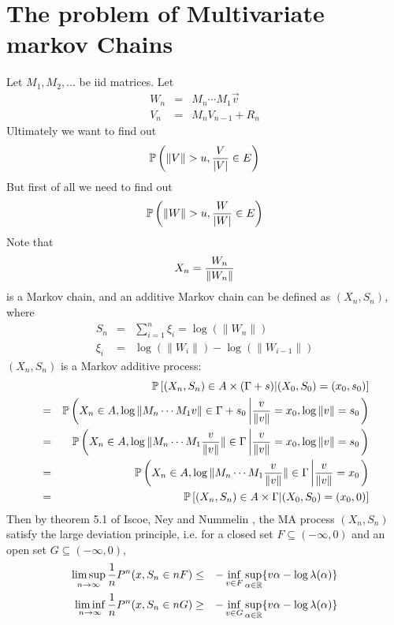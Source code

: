 \documentclass[12pt]{article}
\begin{document}
\section{The problem of Multivariate markov Chains}
Let $M_1, M_2, \dots$ be iid matrices. Let
\begin{eqnarray*}
  W_n &=& M_n \cdots M_1 \vec v  \\
  V_n &=& M_n V_{n-1} + R_n
\end{eqnarray*}
Ultimately we want to find out
\[
\P\left(
  \| V \| > u, {V \over |V|}  \in E
\right)
\]
But first of all we need to find out
\[
\P\left(
  \| W \| > u, {W \over |W|} \in E
\right)
\]
Note that
\[
X_n = {W_n \over \|W_n\|}
\]
is a Markov chain, and an additive Markov chain can be defined as
$(X_n, S_n)$, where
\begin{eqnarray*}
  S_n &=& \sum_{i=1}^n \xi_i = \log(\|W_n\|) \\
  \xi_i &=& \log(\|W_i\|) - \log(\|W_{i-1}\|)
\end{eqnarray*}
$(X_n, S_n)$ is a Markov additive process:
\begin{eqnarray*}
  && \P\left[
    (X_n, S_n) \in A \times (\Gamma + s) |
    (X_0, S_0) = (x_0, s_0)
  \right] \\
  &=& \P\left(
    X_n \in A, \log\|M_n \cdots M_1 v\| \in \Gamma + s_0 \left|
    \frac{v}{\|v\|} = x_0, \log \|v\|=s_0 \right.
  \right) \\
  &=& \P\left(
    X_n \in A, \log\|M_n \cdots M_1 \frac{v}{\|v\|}\| \in \Gamma \left|
    \frac{v}{\|v\|}=x_0, \log \|v\|=s_0 \right.
  \right) \\
  &=& \P\left(
    X_n \in A, \log\|M_n \cdots M_1 \frac{v}{\|v\|}\| \in \Gamma \left|
    \frac{v}{\|v\|}=x_0 \right.
  \right) \\
  &=& \P\left[
    (X_n, S_n) \in A \times \Gamma |
    (X_0, S_0) = (x_0, 0)
  \right]
\end{eqnarray*}
Then by theorem 5.1 of Iscoe, Ney and Nummelin \cite{NeyNummelin1985},
the MA process $(X_n, S_n)$ satisfy the large deviation principle,
i.e. for a closed set $F \subseteq (-\infty, 0)$ and an open set $G
\subseteq (-\infty, 0)$,
\begin{eqnarray*}
  \limsup_{n \to \infty} {1 \over n} P^n (x, S_n \in n F) &\leq&
  -\inf_{v \in F} \sup_{\alpha \in \mathbb R}\{v \alpha - \log
  \lambda(\alpha)\} \\
  \liminf_{n \to \infty} {1 \over n} P^n (x, S_n \in n G) &\geq&
  -\inf_{v \in G} \sup_{\alpha \in \mathbb R}\{v \alpha - \log
  \lambda(\alpha)\}
\end{eqnarray*}
\[
\]



\end{document}
